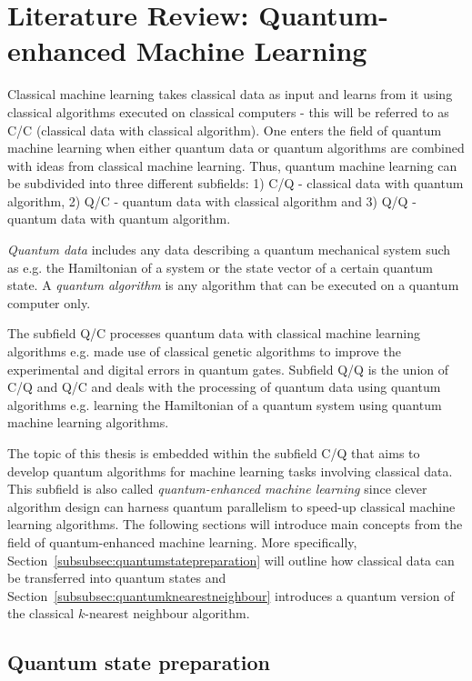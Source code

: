 \chapter{Literature Review: Quantum-enhanced Machine Learning}\label{sec:qml}

Classical machine learning takes classical data as input and learns from it using classical algorithms executed on classical computers - this will be referred to as C/C (classical data with classical algorithm). One enters the field of quantum machine learning when either quantum data or quantum algorithms are combined with ideas from classical machine learning. Thus, quantum machine learning can be subdivided into three different subfields: 1) C/Q - classical data with quantum algorithm, 2) Q/C - quantum data with classical algorithm and 3) Q/Q - quantum data with quantum algorithm.

\emph{Quantum data} includes any data describing a quantum mechanical system such as e.g. the Hamiltonian of a system or the state vector of a certain quantum state. A \emph{quantum algorithm} is any algorithm that can be executed on a quantum computer only. 

The subfield Q/C processes quantum data with classical machine learning algorithms e.g.  made use of classical genetic algorithms to improve the experimental and digital errors in quantum gates. Subfield Q/Q  is the union of C/Q and Q/C and deals with the processing of quantum data using quantum algorithms e.g. learning the Hamiltonian of a quantum system using quantum machine learning algorithms.

The topic of this thesis is embedded within the subfield C/Q that aims to develop quantum algorithms for machine learning tasks involving classical data. This subfield is also called \emph{quantum-enhanced machine learning} since clever algorithm design can harness quantum parallelism to speed-up classical machine learning algorithms. The following sections will introduce main concepts from the field of quantum-enhanced machine learning. More specifically, Section~\ref{subsubsec:quantumstatepreparation} will outline how classical data can be transferred into quantum states and Section~\ref{subsubsec:quantumknearestneighbour} introduces a quantum version of the classical $k$-nearest neighbour algorithm.

\newpage
\section{Quantum state preparation}
\label{subsec:quantumstatepreparation}


